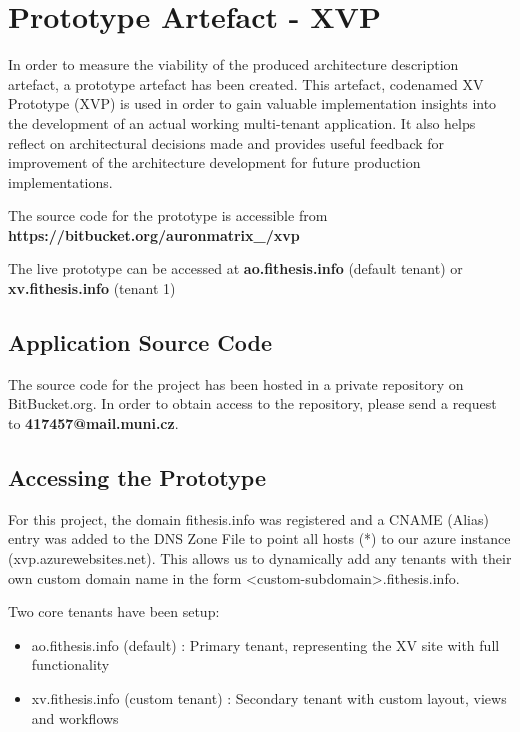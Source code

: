 \chapter{Prototype Artefact - XVP}

In order to measure the viability of the produced architecture description  artefact, a prototype artefact has been created. This artefact, codenamed XV Prototype (XVP) is used in order to gain valuable implementation insights into the development of an actual working multi-tenant  application. It also helps reflect on architectural decisions made and provides useful feedback for improvement of the architecture development for future production implementations.
\begin{tcolorbox}[title=Prototype Source]
The source code for the prototype is accessible from \textbf{https://bitbucket.org/auronmatrix\_/xvp}
\end{tcolorbox}

\begin{tcolorbox}[title=Online Prototype]
The live prototype can be accessed at \textbf{ao.fithesis.info} (default tenant) or \textbf{xv.fithesis.info} (tenant 1)
\end{tcolorbox}

\section{Application Source Code}
The source code for the project has been hosted in a private repository on BitBucket.org. In order to obtain access to the repository, please send a request to 
\textbf{417457@mail.muni.cz}.


\section{Accessing the Prototype}
For this project, the domain fithesis.info was registered and a CNAME (Alias) entry was added to the DNS Zone File to point all hosts (*) to our azure instance (xvp.azurewebsites.net). This allows us to dynamically add any tenants with their own custom domain name in the form
<custom-subdomain>.fithesis.info. 

Two core tenants have been setup:
\begin{itemize}
\item ao.fithesis.info (default) : Primary tenant, representing the XV site with full functionality
\item xv.fithesis.info (custom tenant) : Secondary tenant with custom layout, views and workflows
\end{itemize}

